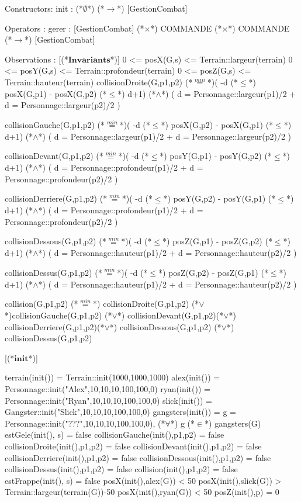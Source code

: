 \documentclass[a4paper, 11pt]{report}
\newcommand{\specB}[1]{\textbf{#1}}
\begin{document}
\begin{Spe}
Constructors:
      init : (*$\emptyset$*) (*$\rightarrow$*) [GestionCombat]
      
Operators :
      gerer : [GestionCombat] (*$\times$*) COMMANDE (*$\times$*) COMMANDE (*$\rightarrow$*) [GestionCombat]

Observations : 
      [(*$\specB{Invariants}$*)]
      	0 <= posX(G,s) <= Terrain::largeur(terrain)
      	0 <= posY(G,s) <= Terrain::profondeur(terrain)
      	0 <= posZ(G,s) <= Terrain::hauteur(terrain)
        collisionDroite(G,p1,p2) (*$\stackrel{min}{=}$*)( -d (*$\le$*) posX(G,p1) - posX(G,p2) (*$\le$*) d+1) (*$\land$*) ( d = Personnage::largeur(p1)/2 + d = Personnage::largeur(p2)/2 )

        collisionGauche(G,p1,p2) (*$\stackrel{min}{=}$*)( -d (*$\le$*) posX(G,p2) - posX(G,p1) (*$\le$*) d+1) (*$\land$*) ( d = Personnage::largeur(p1)/2 + d = Personnage::largeur(p2)/2 )

        collisionDevant(G,p1,p2) (*$\stackrel{min}{=}$*)( -d (*$\le$*) posY(G,p1) - posY(G,p2) (*$\le$*) d+1) (*$\land$*) ( d = Personnage::profondeur(p1)/2 + d = Personnage::profondeur(p2)/2 )

        collisionDerriere(G,p1,p2) (*$\stackrel{min}{=}$*)( -d (*$\le$*) posY(G,p2) - posY(G,p1) (*$\le$*) d+1) (*$\land$*) ( d = Personnage::profondeur(p1)/2 + d = Personnage::profondeur(p2)/2 )

        collisionDessous(G,p1,p2) (*$\stackrel{min}{=}$*)( -d (*$\le$*) posZ(G,p1) - posZ(G,p2) (*$\le$*) d+1) (*$\land$*) ( d = Personnage::hauteur(p1)/2 + d = Personnage::hauteur(p2)/2 )

        collisionDessus(G,p1,p2) (*$\stackrel{min}{=}$*)( -d (*$\le$*) posZ(G,p2) - posZ(G,p1) (*$\le$*) d+1) (*$\land$*) ( d = Personnage::hauteur(p1)/2 + d = Personnage::hauteur(p2)/2 )

        collision(G,p1,p2) (*$\stackrel{min}{=}$*) collisionDroite(G,p1,p2) (*$\lor$*)collisionGauche(G,p1,p2) (*$\lor$*) collisionDevant(G,p1,p2)(*$\lor$*) collisionDerriere(G,p1,p2)(*$\lor$*) collisionDessous(G,p1,p2) (*$\lor$*) collisionDessus(G,p1,p2) 

      [(*$\specB{init}$*)]
    
	terrain(init()) = Terrain::init(1000,1000,1000)
	alex(init()) = Personnage::init("Alex",10,10,10,100,100,0)
	ryan(init()) = Personnage::init("Ryan",10,10,10,100,100,0)
	slick(init()) = Gangster::init("Slick",10,10,10,100,100,0)
	gangsters(init()) = {g = Personnage::init("???",10,10,10,100,100,0)}, (*$\forall$*) g (*$\in$*) gangsters(G)
	estGele(init(), s) = false
        collisionGauche(init(),p1,p2) = false
        collisionDroite(init(),p1,p2) = false
        collisionDevant(init(),p1,p2) = false
        collisionDerriere(init(),p1,p2) = false
        collisionDessous(init(),p1,p2) = false
        collisionDessus(init(),p1,p2) = false
	collision(init(),p1,p2) = false
	estFrappe(init(), s) = false
	posX(init(),alex(G)) < 50
	posX(init(),slick(G)) > Terrain::largeur(terrain(G))-50
	posX(init(),ryan(G)) < 50
	posZ(init(),p) = 0
	

\end{Spe}
\end{document}
